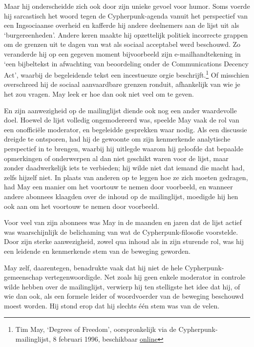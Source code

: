 \documentclass[smalldemyvopaper,11pt,twoside,onecolumn,openright,extrafontsizes,hidelinks]{memoir}
\begin{document}
Maar hij onderscheidde zich ook door zijn unieke gevoel voor humor. Soms
voerde hij sarcastisch het woord tegen de Cypherpunk-agenda vanuit het
perspectief van een Ingsociaanse overheid en kafferde hij andere
deelnemers aan de lijst uit als `burgereenheden'. Andere keren maakte
hij opzettelijk politiek incorrecte grappen om de grenzen uit te dagen
van wat als sociaal acceptabel werd beschouwd. Zo veranderde hij op een
gegeven moment bijvoorbeeld zijn e-mailhandtekening in `een bijbeltekst
in afwachting van beoordeling onder de Communications Decency Act',
waarbij de begeleidende tekst een incestueuze orgie
beschrijft.\footnote{Tim May, `Degrees of Freedom', oorspronkelijk via
  de Cypherpunk-mailinglijst, 8 februari 1996, beschikbaar
  \href{https://cypherpunks.venona.com/date/1996/02/msg00637.html}{online}}
Of misschien overschreed hij de sociaal aanvaardbare grenzen ronduit,
afhankelijk van wie je het zou vragen. May leek er hoe dan ook niet veel
om te geven.

En zijn aanwezigheid op de mailinglijst diende ook nog een ander
waardevolle doel. Hoewel de lijst volledig ongemodereerd was, speelde
May vaak de rol van een onofficiële moderator, en begeleidde gesprekken
waar nodig. Als een discussie dreigde te ontsporen, had hij de gewoonte
om zijn kenmerkende analytische perspectief in te brengen, waarbij hij
uitlegde waarom hij geloofde dat bepaalde opmerkingen of onderwerpen al
dan niet geschikt waren voor de lijst, maar zonder daadwerkelijk iets te
verbieden; hij wilde niet dat iemand die macht had, zelfs hijzelf niet.
In plaats van anderen op te leggen hoe ze zich moeten gedragen, had May
een manier om het voortouw te nemen door voorbeeld, en wanneer andere
abonnees klaagden over de inhoud op de mailinglijst, moedigde hij hen
ook aan om het voortouw te nemen door voorbeeld.

Voor veel van zijn abonnees was May in de maanden en jaren dat de lijst
actief was waarschijnlijk de belichaming van wat de Cypherpunk-filosofie
voorstelde. Door zijn sterke aanwezigheid, zowel qua inhoud als in zijn
sturende rol, was hij een leidende en kenmerkende stem van de beweging
geworden.

May zelf, daarentegen, benadrukte vaak dat hij niet de hele
Cypherpunk-gemeenschap vertegenwoordigde. Net zoals hij geen enkele
moderator in controle wilde hebben over de mailinglijst, verwierp hij
ten stelligste het idee dat hij, of wie dan ook, als een formele leider
of woordvoerder van de beweging beschouwd moest worden. Hij stond erop
dat hij slechts één stem was van de velen.
\end{document}

